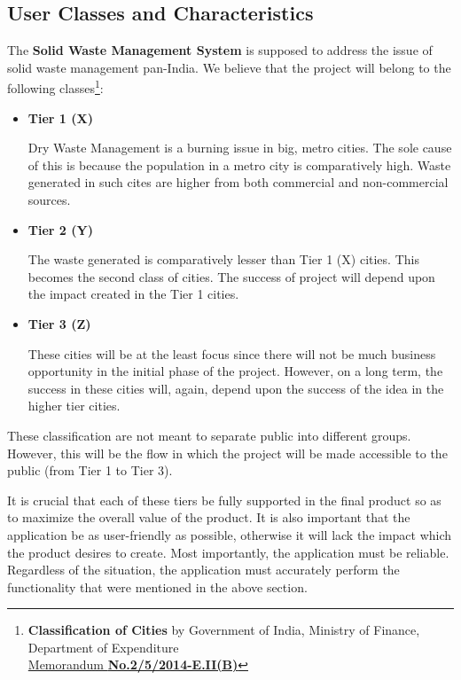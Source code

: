 \documentclass{article}
\begin{document}
\subsection{User Classes and Characteristics}
\par The \textbf{Solid Waste Management System} is supposed to address the issue of solid waste management pan-India. We believe that the project will belong to the following classes\footnote{\textbf{Classification of Cities} by Government of India, Ministry of Finance, Department of Expenditure\\\href{http://www.finmin.nic.in/sites/default/files/21-07-2015_0.pdf}{Memorandum \textbf{No.2/5/2014-E.II(B)}}}:

\begin{itemize}
    \item \textbf{Tier 1 (X)}
    \par Dry Waste Management is a burning issue in big, metro cities. The sole cause of this is because the population in a metro city is comparatively high. Waste generated in such cites are higher from both commercial and non-commercial sources.
    
    \item \textbf{Tier 2 (Y)}
    \par The waste generated is comparatively lesser than Tier 1 (X) cities. This becomes the second class of cities. The success of project will depend upon the impact created in the Tier 1 cities.
    
    \item \textbf{Tier 3 (Z)}
    \par These cities will be at the least focus since there will not be much business opportunity in the initial phase of the project. However, on a long term, the success in these cities will, again, depend upon the success of the idea in the higher tier cities.
\end{itemize}
\par These classification are not meant to separate public into different groups. However, this will be the flow in which the project will be made accessible to the public (from Tier 1 to Tier 3). 
\par It  is  crucial  that  each  of  these  tiers  be  fully  supported  in  the  final  product  so  as  to maximize the overall value of the product. It is also important that the application be as user-friendly as possible, otherwise it will lack the impact which the product desires to create. Most importantly, the application must be reliable. Regardless of the situation, the application must accurately perform the functionality that were mentioned in the above section.  
\end{document}
